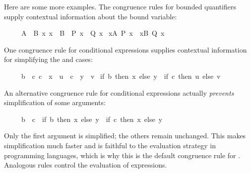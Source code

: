 \begin{isabellebody}
\begin{isamarkuptext}
Here are some more examples.  The congruence rules for bounded
quantifiers supply contextual information about the bound variable:
\begin{isabelle}%
\ \ \ \ \ {}A\ {}\ B{}\ {}x{}\ x\ {}\ B\ {}\ P\ x\ {}\ Q\ x{}\isanewline
{}\ {}{}x{}A{}\ P\ x{}\ {}\ {}{}x{}B{}\ Q\ x{}%
\end{isabelle}
One congruence rule for conditional expressions supplies contextual
information for simplifying the  and  cases:
\begin{isabelle}%
\ \ \ \ \ {}b\ {}\ c{}\ c\ {}\ x\ {}\ u{}\ {}\ c\ {}\ y\ {}\ v{}\isanewline
{}\ {}if\ b\ then\ x\ else\ y{}\ {}\ {}if\ c\ then\ u\ else\ v{}%
\end{isabelle}
An alternative congruence rule for conditional expressions
actually \emph{prevents} simplification of some arguments:
\begin{isabelle}%
\ \ \ \ \ b\ {}\ c\ {}\ {}if\ b\ then\ x\ else\ y{}\ {}\ {}if\ c\ then\ x\ else\ y{}%
\end{isabelle}
Only the first argument is simplified; the others remain unchanged.
This makes simplification much faster and is faithful to the evaluation
strategy in programming languages, which is why this is the default
congruence rule for . Analogous rules control the evaluation of
 expressions.


\end{isamarkuptext}
\end{isabellebody}
